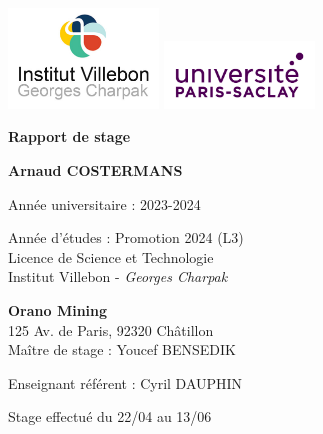 \begin{titlepage}
    \centering
    
    \includegraphics[width=0.3\textwidth]{img/logo/logo_institut.jpeg} \includegraphics[width=0.3\textwidth]{img/logo/UPSaclay.jpg}

    \vspace{1.5cm}
    {\LARGE\textbf{Rapport de stage}\par}
    
    \vspace{1.5cm}
    {\large\textbf{Arnaud COSTERMANS}\par}
    
    \vspace{0.5cm}
    Année universitaire : 2023-2024
    
    \vspace{0.5cm}
    Année d'études : Promotion 2024 (L3) \\
    Licence de Science et Technologie \\
    Institut Villebon - \textit{Georges Charpak}
    
    \vspace{2cm}
    
    
    \vspace{0.5cm}
    \textbf{Orano Mining}\\
    125 Av. de Paris, 92320 Châtillon\\
    \vspace{0.5cm}
    Maître de stage : Youcef BENSEDIK
    
    \vspace{0.5cm}
    Enseignant référent : Cyril DAUPHIN
    
    \vspace{0.5cm}
    Stage effectué du 22/04 au 13/06 
\end{titlepage}
\clearpage